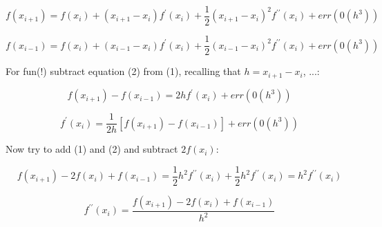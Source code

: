 \documentclass[12pt]{article}
\begin{document}
\begin{equation}
 f(x_{i+1}) = f(x_i) + (x_{i+1} - x_i)f^{\prime}(x_i) + \frac{1}{2}(x_{i+1} - x_i)^2 f^{\prime\prime}(x_i) + err(0(h^3))
\end {equation}

\begin{equation}
 f(x_{i-1}) = f(x_i) + (x_{i-1} - x_i) f^{\prime}(x_i) + \frac{1}{2}(x_{i-1} - x_i)^2 f^{\prime\prime}(x_i) + err(0(h^3))
\end {equation}

\noindent For fun(!) subtract equation (2) from (1), recalling that $h = x_{i+1} - x_i$, ...:

\begin{equation}
 f(x_{i+1}) - f(x_{i-1}) = 2hf^{\prime}(x_i) + err(0(h^3))
\end {equation}

\begin{equation}
 f^{\prime}(x_i) = \frac{1}{2h}[f(x_{i+1}) - f(x_{i-1})] + err(0(h^3))
 \end {equation}

\noindent Now try to add (1) and (2) and subtract $2f(x_i)$:

\begin{equation}
 f(x_{i+1}) - 2f(x_i) + f(x_{i-1}) = \frac{1}{2}h^2 f^{\prime\prime}(x_i) + \frac{1}{2}h^2 f^{\prime\prime}(x_i) = h^2 f^{\prime\prime}(x_i)
 \end {equation}
 
 \begin{equation}
  f^{\prime\prime}(x_i) = \frac{f(x_{i+1}) - 2f(x_i) + f(x_{i-1})}{h^2}
 \end {equation}
  
\end{document}
